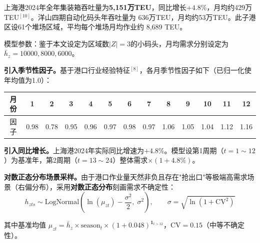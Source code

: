 \documentclass[12pt,a4paper]{article}
\newcommand{\手批注}[2]{\textcolor{#1}{\text{\kaishu #2}}}
\newcommand{\一阶段}{\textcolor{firststage}{\text{\kaishu （一阶段）}}}
\newcommand{\二阶段}{\textcolor{secondstage}{\text{\kaishu （二阶段）}}}
\begin{document}
上海港2024年全年集装箱吞吐量为\textbf{5,151万TEU}，同比增长$+4.8\%$，月均约429万TEU$^{[10]}$。洋山四期自动化码头年吞吐量为 636万TEU，月均约53万TEU。此子港区设61个堆场区域，平均每个堆场月均作业约 8,689 TEU。

模型参数：鉴于本文设定为区域数$|Z|=3$的小码头，月均需求分别设定为$\bar{h}_z={10000,8000,6000}$。

\textbf{引入季节性因子。}基于港口行业经验特征$^{[8]}$，各月季节性因子如下（已归一化使年均值为1.0）：
\begin{center}
\begin{tabular}{c|cccccccccccc}
\toprule
月份 & 1 & 2 & 3 & 4 & 5 & 6 & 7 & 8 & 9 & 10 & 11 & 12 \\
\midrule
因子 & 0.98 & 0.78 & 0.95 & 0.96 & 0.97 & 0.98 & 0.97 & 1.06 & 1.05 & 1.04 & 1.12 & 1.16 \\
\bottomrule
\end{tabular}
\end{center}

\textbf{引入同比增长。}上海港2024年实际同比增速为$+4.8\%$。模型设第1周期（$t=1\sim12$）为基准年，第2周期（$t=13\sim24$）整体需求$\times(1+4.8\%)$。

\textbf{对数正态分布场景采样。}由于港口作业量天然非负且存在"抢出口"等极端高需求场景（右偏分布），采用\textbf{对数正态分布}刻画需求不确定性：
\begin{equation}
    h_{zts} \sim \text{LogNormal}\left(\ln(\mu_{zt}) - \frac{\sigma^2}{2},\; \sigma^2\right), \qquad \sigma = \sqrt{\ln(1 + \text{CV}^2)}
    \label{eq:lognormal}
\end{equation}

其中基准均值 $\mu_{zt} = \bar{h}_z \times \text{season}_t \times (1 + 0.048)^{\mathbf{1}_{t>12}}$，CV$=0.15$（中等不确定性）。
\end{document}
